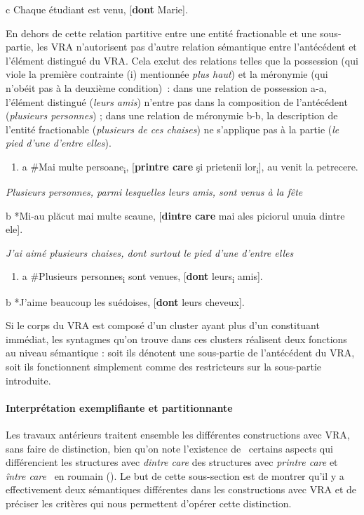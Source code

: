   c  Chaque étudiant est venu, [\textbf{dont} Marie].

En dehors de cette relation partitive entre une entité fractionable et une sous-partie, les VRA n'autorisent pas d'autre relation sémantique entre l'antécédent et l'élément distingué du VRA. Cela exclut des relations telles que la possession (qui viole la première contrainte (i) mentionnée \textit{plus haut}) et la méronymie (qui n'obéit pas à la deuxième condition)\textit{~}: dans une relation de possession a-a, l'élément distingué (\textit{leurs} \textit{amis}) n'entre pas dans la composition de l'antécédent (\textit{plusieurs personnes}) ; dans une relation de méronymie b-b, la description de l'entité fractionable (\textit{plusieurs de ces chaises}) ne s'applique pas à la partie (\textit{le pied d'une d'entre elles}).


\begin{enumerate}
\item \label{bkm:Ref294168580}a  \#Mai multe persoane\textsubscript{i}, [\textbf{printre care} şi prietenii lor\textsubscript{i}], au venit la petrecere.  


\end{enumerate}
{\itshape
Plusieurs personnes, parmi lesquelles leurs amis, sont venus à la fête} 

  b  *Mi-au plăcut mai multe scaune, [\textbf{dintre care} mai ales piciorul unuia dintre ele].

{\itshape
J'ai aimé plusieurs chaises, dont surtout le pied d'une d'entre elles} 


\begin{enumerate}
\item \label{bkm:Ref294168582}a  \#Plusieurs personnes\textsubscript{i} sont venues, [\textbf{dont} leurs\textsubscript{i} amis]. 


\end{enumerate}
  b  *J'aime beaucoup les suédoises, [\textbf{dont} leurs cheveux].

Si le corps du VRA est composé d'un cluster ayant plus d'un constituant immédiat, les syntagmes qu'on trouve dans ces clusters réalisent deux fonctions au niveau sémantique : soit ils dénotent une sous-partie de l'antécédent du VRA, soit ils fonctionnent simplement comme des restricteurs sur la sous-partie introduite.

\paragraph[Interprétation exemplifiante et partitionnante]{Interprétation exemplifiante et partitionnante}
\label{bkm:Ref294028383}Les travaux antérieurs traitent ensemble les différentes constructions avec VRA, sans faire de distinction, bien qu'on note l'existence de {\guillemotleft}~certains aspects qui différencient les structures avec \textit{dintre care} des structures avec \textit{printre care} et \textit{între care}~{\guillemotright} en roumain (\citep[271]{Gheorghe2004}). Le but de cette sous-section est de montrer qu'il y a effectivement deux sémantiques différentes dans les constructions avec VRA et de préciser les critères qui nous permettent d'opérer cette distinction.

